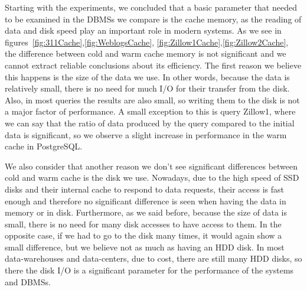 Starting with the experiments, we concluded that a basic parameter that needed to be examined 
in the DBMSs we compare is the cache memory, as the reading of data and disk speed play an 
important role in modern systems. As we see in figures~\ref{fig:311Cache},\ref{fig:WeblogsCache},
\ref{fig:Zillow1Cache},\ref{fig:Zillow2Cache}, the difference between cold and warm 
cache memory is not significant and we cannot extract reliable conclusions about its efficiency. 
The first reason we believe this happens is the size of the data we use. In other words, 
because the data is relatively small, there is no need for much I/O for their transfer from 
the disk. Also, in most queries the results are also small, so writing them to the disk is 
not a major factor of performance. A small exception to this is query Zillow1, where we 
can say that the ratio of data produced by the query compared to the initial data is 
significant, so we observe a slight increase in performance in the warm cache in PostgreSQL.

We also consider that another reason we don't see significant differences between cold and 
warm cache is the disk we use. Nowadays, due to the high speed of SSD disks and their internal 
cache to respond to data requests, their access is fast enough and therefore no significant 
difference is seen when having the data in memory or in disk. Furthermore, as we said before, 
because the size of data is small, there is no need for many disk accesses to have access to 
them. In the opposite case, if we had to go to the disk many times, it would again show a 
small difference, but we believe not as much as having an HDD disk. In most data-warehouses 
and data-centers, due to cost, there are still many HDD disks, so there the disk I/O is a 
significant parameter for the performance of the systems and DBMSs.



